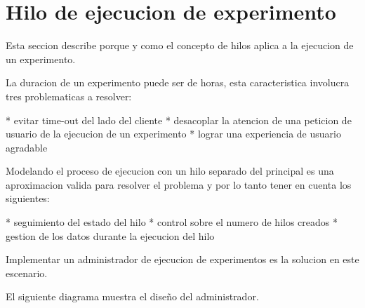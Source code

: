 \section{Hilo de ejecucion de experimento}

Esta seccion describe porque y como el concepto de hilos aplica a la ejecucion de un experimento.

La duracion de un experimento puede ser de horas, esta caracteristica involucra tres problematicas
a resolver:

* evitar time-out del lado del cliente
* desacoplar la atencion de una peticion de usuario de la ejecucion de un experimento
* lograr una experiencia de usuario agradable

Modelando el proceso de ejecucion con un hilo separado del principal es una aproximacion
valida para resolver el problema y por lo tanto tener en cuenta los siguientes:

* seguimiento del estado del hilo
* control sobre el numero de hilos creados
* gestion de los datos durante la ejecucion del hilo

Implementar un administrador de ejecucion de experimentos es la solucion en este escenario.

El siguiente diagrama muestra el diseño del administrador.

\newpage